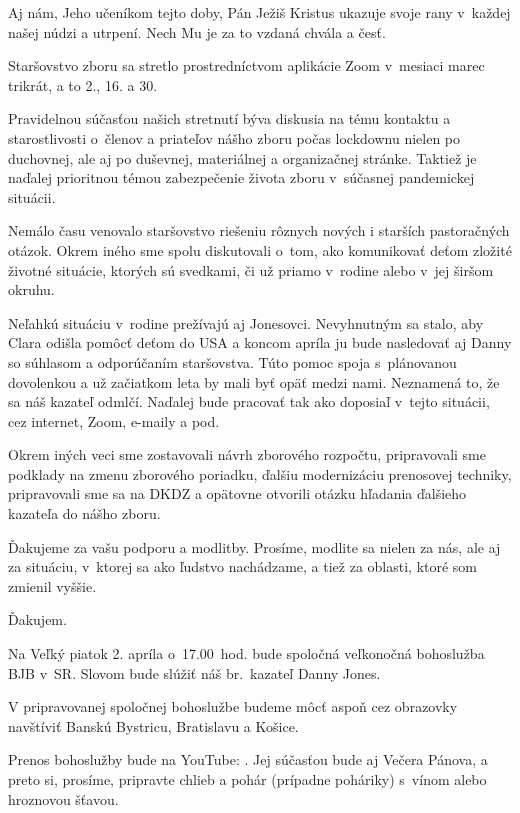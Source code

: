 Aj nám, Jeho učeníkom tejto doby, Pán Ježiš Kristus ukazuje svoje rany v~každej našej núdzi a utrpení. Nech Mu je za to vzdaná chvála a česť.


Staršovstvo zboru sa stretlo prostredníctvom aplikácie Zoom v~mesiaci marec trikrát, a to 2., 16. a 30.

Pravidelnou súčasťou našich stretnutí býva diskusia na tému kontaktu a starostlivosti o~členov a priateľov nášho zboru počas lockdownu nielen po duchovnej, ale aj po duševnej, materiálnej a organizačnej stránke. Taktiež je naďalej prioritnou témou zabezpečenie života zboru v~súčasnej pandemickej situácii.

Nemálo času venovalo staršovstvo riešeniu rôznych nových i starších pastoračných otázok. Okrem iného sme spolu diskutovali o~tom, ako komunikovať deťom zložité životné situácie, ktorých sú svedkami, či už priamo v~rodine alebo v~jej širšom okruhu.

Neľahkú situáciu v~rodine prežívajú aj Jonesovci. Nevyhnutným sa stalo, aby Clara odišla pomôcť deťom do USA a koncom apríla ju bude nasledovať aj Danny so súhlasom a odporúčaním staršovstva. Túto pomoc spoja s~plánovanou dovolenkou a už začiatkom leta by mali byť opäť medzi nami. Neznamená to, že sa náš kazateľ odmlčí. Naďalej bude pracovať tak ako doposiaľ v~tejto situácii, cez internet, Zoom, e-maily a pod.

Okrem iných veci sme zostavovali návrh zborového rozpočtu, pripravovali sme podklady na zmenu zborového poriadku, ďalšiu modernizáciu prenosovej techniky, pripravovali sme sa na DKDZ a opätovne otvorili otázku hľadania ďalšieho kazateľa do nášho zboru.

Ďakujeme za vašu podporu a modlitby. Prosíme, modlite sa nielen za nás, ale aj za situáciu, v~ktorej sa ako ľudstvo nachádzame, a tiež za oblasti, ktoré som zmienil vyššie.

Ďakujem.



Na Veľký piatok 2. apríla o~17.00~hod. bude spoločná veľkonočná bohoslužba BJB v~SR. Slovom bude slúžiť náš br.~kazateľ Danny Jones.

V pripravovanej spoločnej bohoslužbe budeme môcť aspoň cez obrazovky navštíviť Banskú Bystricu, Bratislavu a Košice.

Prenos bohoslužby bude na YouTube: . Jej súčasťou bude aj Večera Pánova, a preto si, prosíme, pripravte chlieb a pohár (prípadne poháriky) s~vínom alebo hroznovou šťavou.

